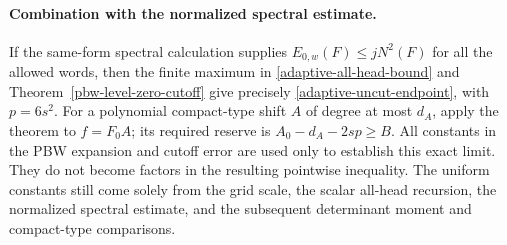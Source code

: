 \paragraph{Combination with the normalized spectral estimate.}
If the same-form spectral calculation supplies
$E_{0,w}(F)\le jN^2(F)$ for all the allowed words, then the
finite maximum in \eqref{adaptive-all-head-bound} and
Theorem~\ref{pbw-level-zero-cutoff} give precisely
\eqref{adaptive-uncut-endpoint}, with $p=6s^2$.
For a polynomial compact-type shift $A$ of degree at most $d_A$,
apply the theorem to $f=F_0A$; its required reserve is
$A_0-d_A-2sp\ge B$.
All constants in the PBW expansion and
cutoff error are used only to establish this exact limit.  They
do not become factors in the resulting pointwise inequality.
The uniform constants still come solely from the grid scale,
the scalar all-head recursion, the normalized spectral estimate,
and the subsequent determinant moment and compact-type
comparisons.
